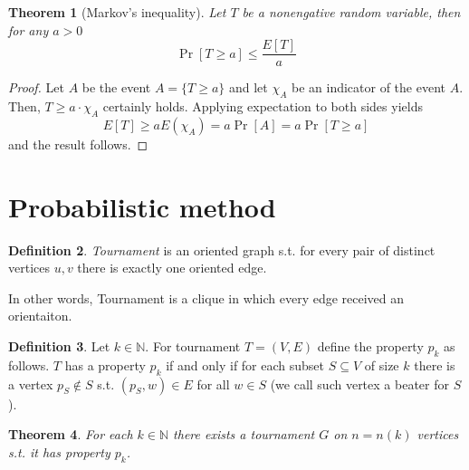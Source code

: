 \documentclass{article}
\theoremstyle{plain}
\newtheorem{thm}{Theorem}[section]
\theoremstyle{definition}
\newtheorem{defn}[thm]{Definition}
\begin{document}
\begin{thm}[Markov's inequality]
	Let $T$ be a nonengative random variable, then for any $a > 0$
	$$
	\Pr[T\geq a]\leq\frac{E[T]}{a}	
	$$
\end{thm}
\begin{proof}
	Let $A$ be the event $A=\{T\geq a\}$ and let $\chi_A$ be an indicator of the event $A$. Then, $T\geq a\cdot \chi_A$ certainly holds. Applying expectation to both sides yields
	$$
	E[T]\geq a E(\chi_A)=a\Pr[A]=a\Pr[T\geq a]
	$$
	and the result follows.
\end{proof}


\section{Probabilistic method}

\begin{defn}
	\textit{Tournament} is an oriented graph s.t. for every pair of distinct vertices $u,v$ there is exactly one oriented edge.
\end{defn}

In other words, Tournament is a clique in which every edge received an orientaiton.

\begin{defn}
	Let $k\in\mathbb{N}$. For tournament $T=(V,E)$ define the property $p_k$ as follows. $T$ has a property $p_k$ if and only if for each subset $S\subseteq V$ of size $k$ there is a vertex $p_S\notin S$ s.t. $(p_S,w)\in E$ for all $w\in S$ (we call such vertex a beater for $S$). 
\end{defn}

\begin{thm}
	For each $k\in\mathbb{N}$ there exists a tournament $G$ on $n=n(k)$ vertices s.t. it has property $p_k$.
\end{thm}
\end{document}
